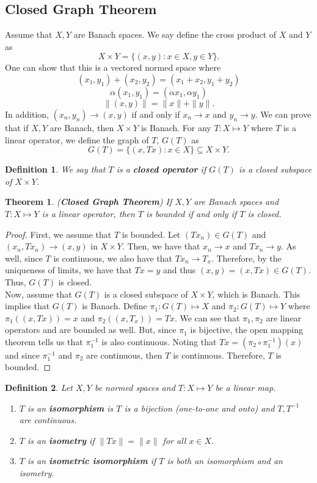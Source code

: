 \documentclass[12pt]{article}
\newtheorem{theorem}{Theorem}
\newtheorem{definition}{Definition}
\newcommand{\sse}{\subseteq}
\begin{document}
 \subsection*{Closed Graph Theorem}
 Assume that $X, Y$ are Banach spaces. We say define the cross product of $X$ and $Y$ as 
 \[ X \times Y = \{ (x, y) : x \in X, y \in Y\}. \]
 One can show that this is a vectored normed space where 
 \[ (x_1, y_1) + (x_2, y_2) = (x_1  + x_2, y_1 + y_2)\]
 \[ \alpha(x_1, y_1) = (\alpha x_1, \alpha y_1)\]
 \[ \| (x, y)\| = \| x \| + \|y \|.\]
 In addition, $(x_n, y_n ) \to (x, y)$ if and only if $x_n \to x$ and $y_n \to y$. We can prove that if $X, Y$ are Banach, then $X \times Y$ is Banach. For any $T: X \mapsto Y$ where $T$ is a linear operator, we define the graph of $T$, $G(T)$ as 
 \[ G(T) = \{ (x, Tx) : x \in X \} \sse X \times Y.\]
 \begin{definition}
 We say that $T$ is a \textbf{closed operator} if $G(T)$ is a closed subspace of $X \times Y$. 
\end{definition}
\begin{theorem}
(\textbf{Closed Graph Theorem}) If $X, Y$ are Banach spaces and $T: X \mapsto Y$ is a linear operator, then $T$ is bounded if and only if $T$ is closed. 
\end{theorem}
\vspace{-25pt}
\begin{proof}
First, we assume that $T$ is bounded. Let $(Tx_n) \in G(T)$ and $(x_n , Tx_n) \to (x, y)$ in $X \times Y$. Then, we have that $x_n \to x$ and $T x_n \to y$. As well, since $T$ is continuous, we also have that $Tx_n \to T_x$. Therefore, by the uniqueness of limits, we have that $Tx = y$ and thus $(x, y) = (x, Tx) \in G(T)$. Thus, $G(T)$ is closed. \\
\indent Now, assume that $G(T)$ is a closed subspace of $X \times Y$, which is Banach. This implies that $G(T)$ is Banach. Define $\pi_1: G(T) \mapsto X$ and $\pi_2: G(T) \mapsto Y$ where $\pi_1((x, Tx)) = x$ and $\pi_2((x, T_x)) = Tx$. We can see that $\pi_1, \pi_2$ are linear operators and are bounded as well. But, since $\pi_1$ is bijective, the open mapping theorem tells us that $\pi_1^{-1}$ is also continuous. Noting that $Tx = (\pi_2 \circ \pi_1^{-1})(x)$ and since $\pi_1^{-1}$ and $\pi_2$ are continuous, then $T$ is continuous. Therefore, $T$ is bounded. 
\end{proof}
\begin{definition}
Let $X, Y$ be normed spaces and $T: X \mapsto Y$ be a linear map.
\begin{enumerate}[topsep=-15pt, itemsep=0pt]
\item $T$ is an \textbf{isomorphism} is $T$ is a bijection (one-to-one and onto) and $T, T^{-1}$ are continuous. 
\item $T$ is an \textbf{isometry} if $\| Tx \| = \| x \|$ for all $x \in X$. 
\item $T$ is an \textbf{isometric isomorphism} if $T$ is both an isomorphism and an isometry. 
\end{enumerate}
\end{definition}
\end{document}
